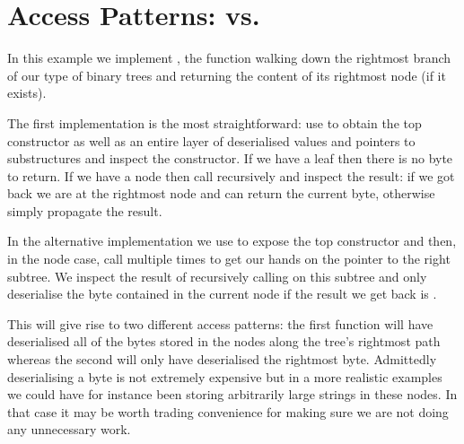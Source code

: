 \section{Access Patterns:  vs. }\label{appendix:rightmost}

In this example we implement , the function walking
down the rightmost branch of our type of binary trees and returning the
content of its rightmost node (if it exists).

The first implementation is the most straightforward: use 
to obtain the top constructor as well as an entire layer of deserialised values
and pointers to substructures and inspect the constructor.
%
If we have a leaf then there is no byte to return.
%
If we have a node then call  recursively and inspect the
result: if we got  back we are at the rightmost node and can
return the current byte, otherwise simply propagate the result.


In the alternative implementation we use  to expose the top
constructor and then, in the node case, call  multiple times
to get our hands on the pointer to the right subtree.
%
We inspect the result of recursively calling  on this
subtree and only deserialise the byte contained in the current node if the result
we get back is .


This will give rise to two different access patterns: the first function will
have deserialised all of the bytes stored in the nodes along the tree's
rightmost path whereas the second will only have deserialised the rightmost byte.
%
Admittedly deserialising a byte is not extremely expensive but in a more realistic
examples we could have for instance been storing arbitrarily large strings in
these nodes. In that case it may be worth trading convenience for making sure we
are not doing any unnecessary work.
